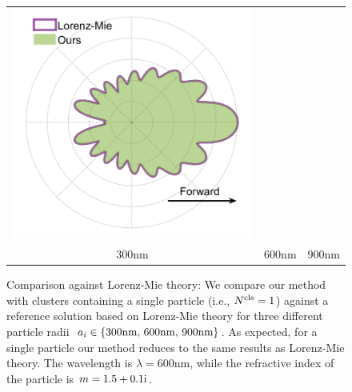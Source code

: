 \begin{figure}
\begin{tabular}{ccc}
        \includegraphics[width=\resLen]{images/pfunc/mie_900nm.png}  
        \\
        300nm & 600nm & 900nm
    \end{tabular}
    \caption{\label{fig:mie}
    Comparison against Lorenz-Mie theory: We compare our method with clusters containing a single particle (i.e., ${N^\text{cls}}=1$) against a reference solution based on Lorenz-Mie theory for three different particle radii~$a_i \in \{ \text{300nm, 600nm, 900nm} \}$. As expected, for a single particle our method reduces to the same results as Lorenz-Mie theory. The wavelength is $\lambda=600$nm, while the refractive index of the particle is $m=1.5+0.1\text{i}$.  
}
\end{figure}
